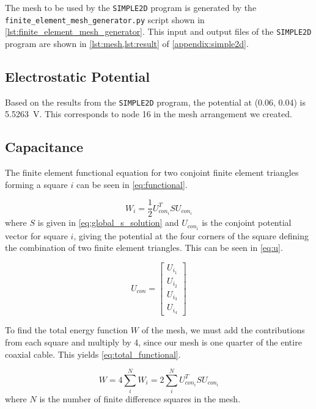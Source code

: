 \documentclass[a4paper,titlepage]{article}
\begin{document}
	The mesh to be used by the \texttt{SIMPLE2D} program is generated by the \texttt{finite_element_mesh_generator.py} script shown in \cref{lst:finite_element_mesh_generator}. This input and output files of the \texttt{SIMPLE2D} program are shown in \cref{lst:mesh,lst:result} of \autoref{appendix:simple2d}.
	
	\subsection{Electrostatic Potential}
	
	Based on the results from the \texttt{SIMPLE2D} program, the potential at (0.06, 0.04) is \SI{5.5263}{\volt}. This corresponds to node 16 in the mesh arrangement we created.
	
	\subsection{Capacitance}
	
	The finite element functional equation for two conjoint finite element triangles forming a square $i$ can be seen in \cref{eq:functional}.
	
	\begin{equation} \label{eq:functional}
		W_i = \frac{1}{2} U_{con_i}^T S U_{con_i}
	\end{equation}
	where $S$ is given in \cref{eq:global_s_solution} and $U_{con_i}$ is the conjoint potential vector for square $i$, giving the potential at the four corners of the square defining the combination of two finite element triangles. This can be seen in \cref{eq:u}.
	
	\begin{equation} \label{eq:u}
		U_{con} = 
			\begin{bmatrix}
				U_{i_1} \\
				U_{i_2} \\
				U_{i_3} \\
				U_{i_4}
			\end{bmatrix}
	\end{equation}
	
	To find the total energy function $W$ of the mesh, we must add the contributions from each square and multiply by 4, since our mesh is one quarter of the entire coaxial cable. This yields \cref{eq:total_functional}.
	
	\begin{equation} \label{eq:total_functional}
		W = 4 \sum_{i}^{N}{W_i} = 2 \sum_{i}^{N}{U_{con_i}^T S U_{con_i}}
	\end{equation} 
	where $N$ is the number of finite difference squares in the mesh.
	
\end{document}
